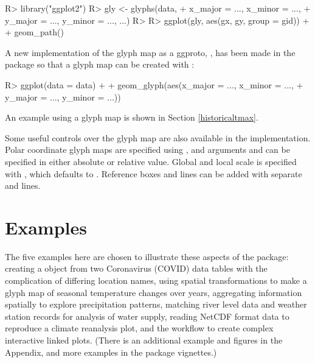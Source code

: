 \documentclass[
  shortnames]{jss}
\begin{document}
\begin{CodeChunk}
\begin{CodeInput}
R> library("ggplot2")
R> gly <- glyphs(data,
+               x_major = ..., x_minor = ...,
+               y_major = ..., y_minor = ..., ...)
R> 
R> ggplot(gly, aes(gx, gy, group = gid)) +
+   geom_path()
\end{CodeInput}
\end{CodeChunk}

A new implementation of the glyph map as a ggproto, , has been made in the  package so that a glyph map can be created with :

\begin{CodeChunk}
\begin{CodeInput}
R> ggplot(data = data) +
+   geom_glyph(aes(x_major = ..., x_minor = ...,
+                  y_major = ..., y_minor = ...))
\end{CodeInput}
\end{CodeChunk}

An example using a glyph map is shown in Section \ref{historicaltmax}.

Some useful controls over the glyph map are also available in the  implementation. Polar coordinate glyph maps are specified using , and arguments  and  can be specified in either absolute or relative value. Global and local scale is specified with , which defaults to . Reference boxes and lines can be added with separate  and  lines.

\hypertarget{examples}{%
\section{Examples}\label{examples}}

The five examples here are chosen to illustrate these aspects of the  package: creating a  object from two Coronavirus (COVID) data tables with the complication of differing location names, using spatial transformations to make a glyph map of seasonal temperature changes over years, aggregating information spatially to explore precipitation patterns, matching river level data and weather station records for analysis of water supply, reading NetCDF format data to reproduce a climate reanalysis plot, and the workflow to create complex interactive linked plots. (There is an additional example and figures in the Appendix, and more examples in the package vignettes.)
\end{document}
